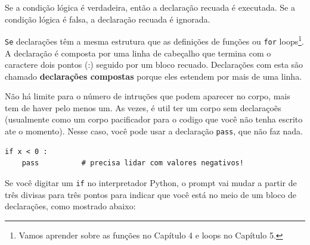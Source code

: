 Se a condição lógica é verdadeira, então a declaração
recuada é executada. Se a condição lógica é
falsa, a declaração recuada é ignorada.



{\tt Se} declarações têm a mesma estrutura que as definições de funções
ou {\tt for} loops\footnote{Vamos aprender sobre as funções no Capítulo 4
e loops no Capítulo 5.}. A declaração é composta por uma linha de cabeçalho
que termina com o caractere dois pontos (:)
seguido por um bloco recuado. Declarações com esta são
chamado {\bf declarações compostas} porque eles estendem  
por mais de uma linha.


Não há limite para o número de intruções que podem aparecer 
no corpo, mais tem de haver pelo menos um.
As vezes, é util ter um corpo sem declaraçoẽs (usualmente
como um corpo pacificador para o codigo que você não tenha escrito ate o momento). Nesse
caso, você pode usar a declaração {\tt pass}, que não faz nada.



\beforeverb
\begin{verbatim}
if x < 0 :
    pass          # precisa lidar com valores negativos!
\end{verbatim}
\afterverb
%
Se você digitar um {\tt if} no interpretador Python, o prompt vai mudar
a partir de três divisas para três pontos para indicar que você está no meio de um bloco de
declarações, como mostrado abaixo:

